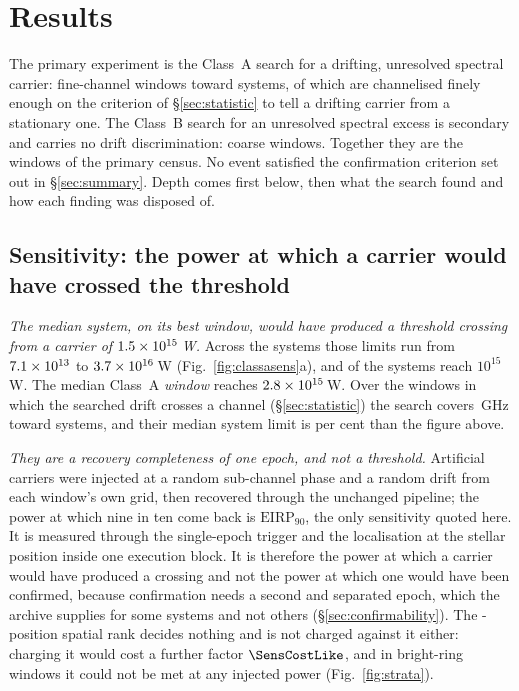 \section{Results}
\label{sec:results}

The primary experiment is the Class~A search for a drifting, unresolved
spectral carrier: \NWinA{} fine-channel windows toward \NSysClassA{}
systems, \EdrNWinA{} of which are channelised finely enough on the criterion
of \S\ref{sec:statistic} to tell a drifting carrier from a stationary one.
The Class~B search for an unresolved spectral excess is secondary
and carries no drift discrimination: \NWinB{} coarse windows. Together they
are the \NWindows{} windows of the primary census. No event
satisfied the confirmation criterion set out in \S\ref{sec:summary}. Depth
comes first below, then what the search found and how each finding was
disposed of.

\subsection{Sensitivity: the power at which a carrier would have crossed
the threshold} \label{sec:pninetysel}

\emph{The median system, on its best window, would have produced a threshold
crossing from a carrier of $1.5\times10^{15}$\,W.} Across the \NSysClassA{} systems those limits
run from $7.1\times10^{13}$ to $3.7\times10^{16}$\,W
(Fig.~\ref{fig:classasens}a), and \NSysEfifteen{} of the systems reach
$10^{15}$\,W. The median Class~A \emph{window} reaches
$2.8\times10^{15}$\,W.
Over the \EdrNWinA{} windows in which the searched drift crosses a channel
(\S\ref{sec:statistic}) the search covers \EdrUnionGHz\,GHz toward
\EdrNSys{} systems, and their median system limit is \ScEdrMedPct{} per cent
\ScEdrMedSense{} than the figure above.

\emph{They are a recovery completeness of one epoch, and not a threshold.}
Artificial carriers were injected at a random sub-channel phase and a random
drift from each window's own grid, then recovered through the unchanged
pipeline; the power at which nine in ten come back is
$\mathrm{EIRP}_{90}$, the only sensitivity quoted here. It is measured
through the single-epoch trigger and the localisation at the stellar position
inside one execution block. It is therefore the power at which a
carrier would have produced a crossing and not the power at which one would
have been confirmed, because confirmation needs a second and separated epoch, which the archive
supplies for some systems and not others (\S\ref{sec:confirmability}). The \NCtrl-position spatial rank
decides nothing and is not charged against it either: charging it would cost
a further factor $\SensCostLike$, and in \SensNRingHiUnres{} bright-ring
windows it could not be met at any injected power (Fig.~\ref{fig:strata}).

